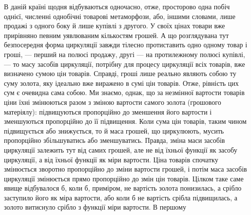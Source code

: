 В даній країні щодня відбуваються одночасно, отже, просторово
одна побіч однієї, численні однобічні товарові метаморфози,
або, іншими словами, лише продажі з одного боку й лише купівлі
з другого. У своїх цінах товари вже прирівняно певним уявлюваним
кількостям грошей. А що розглядувана тут безпосередня
форма циркуляції завжди тілесно протиставить одно одному
товар і гроші, — перший на полюсі продажу, другі — на протилежному
полюсі купівлі, — то масу засобів циркуляції, потрібну
для процесу циркуляції всіх товарів, вже визначено сумою цін
товарів. Справді, гроші лише реально являють собою ту суму
золота, яку ідеально вже виражено в сумі цін товарів. Отже,
рівність цих сум є очевидна сама собою. Ми знаємо, однак, що
за незмінної вартости товарів ціни їхні змінюються разом з
зміною вартости самого золота (грошового матеріялу): підвищуються
пропорційно до зменшення його вартости і зменшуються
пропорційно до її підвищення. Коли сума цін товарів,
таким чином підвищується або знижується, то й маса грошей,
що циркулюють, мусить пропорційно збільшуватись або зменшуватись.
Правда, зміна маси засобів циркуляції залежить тут від
самих грошей, але не від їхньої функції як засобу циркуляції,
а від їхньої функції як міри вартости. Ціна товарів спочатку
змінюється зворотно пропорційно до зміни вартости грошей,
і потім маса засобів циркуляції змінюється прямо пропорційно
до змін цін товарів. Цілком таке саме явище відбувалося б, коли б,
приміром, не вартість золота понизилась, а срібло заступило
його як міра вартости, або коли б не вартість срібла підвищилась,
а золото витиснуло срібло з функції міри вартости. В першому
\parbreak{}  %
